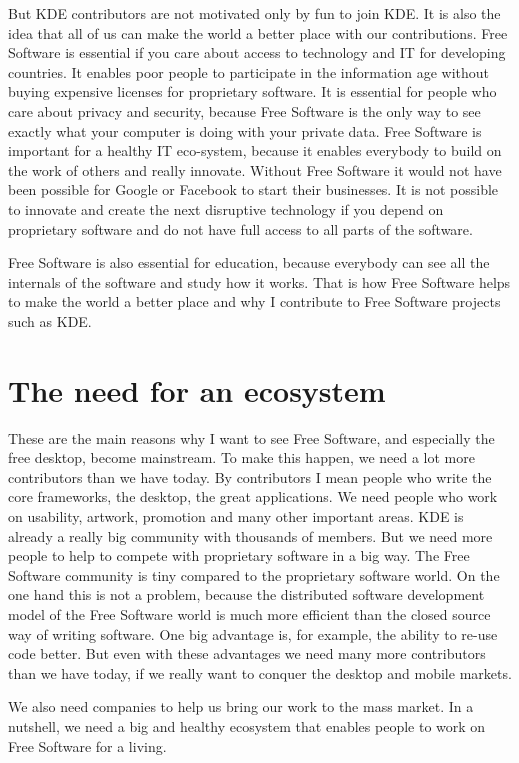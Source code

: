 But KDE contributors are not motivated only by fun to join KDE. It is also the
idea that all of us can make the world a better place with our contributions. Free
Software is essential if you care about access to technology and IT for
developing countries. It enables poor people to participate in the information
age without buying expensive licenses for proprietary software. It is
essential for people who care about privacy and security, because Free Software
is the only way to see exactly what your computer is doing with your private
data. Free Software is important for a healthy IT eco-system, because it enables
everybody to build on the work of others and really innovate. Without Free
Software it would not have been possible for Google or Facebook to start their
businesses. It is not possible to innovate and create the next disruptive
technology if you depend on proprietary software and do not have full access to
all parts of the software.

Free Software is also essential for education, because everybody can see all the
internals of the software and study how it works. That is how Free Software helps to
make the world a better place and why I contribute to Free Software projects
such as KDE. 

\section*{The need for an ecosystem}

These are the main reasons why I want to see Free Software, and especially the
free desktop, become mainstream. To make this happen, we need a lot more
contributors than we have today. By contributors I mean people who write the
core frameworks, the desktop, the great applications. We need people who work on
usability, artwork, promotion and many other important areas. KDE is already a
really big community with thousands of members. But we need more people to help 
to compete with proprietary software in a big way. The Free Software community
is tiny compared to the proprietary software world. On the one hand this is not
a problem, because the distributed software development model of the Free
Software world is much more efficient than the closed source way of writing
software. One big advantage is, for example, the ability to re-use code better.
But even with these advantages we need many more contributors than we have
today, if we really want to conquer the desktop and mobile markets.

We also need companies to help us bring our work to the mass market. In a
nutshell, we need a big and healthy ecosystem that enables people to work on
Free Software for a living.

